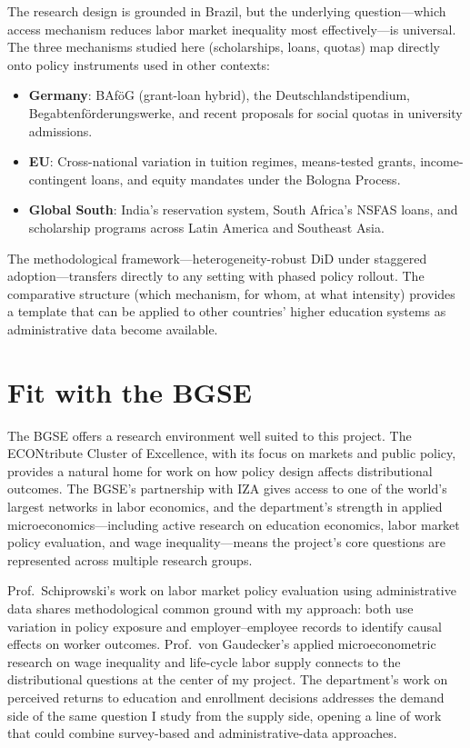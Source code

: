 \documentclass[a4paper,11pt]{article}
\begin{document}
The research design is grounded in Brazil, but the underlying question---which access mechanism reduces labor market inequality most effectively---is universal. The three mechanisms studied here (scholarships, loans, quotas) map directly onto policy instruments used in other contexts:

\begin{itemize}[nosep]
    \item \textbf{Germany}: BAf\"oG (grant-loan hybrid), the Deutschlandstipendium, Begabtenf\"orderungswerke, and recent proposals for social quotas in university admissions.
    \item \textbf{EU}: Cross-national variation in tuition regimes, means-tested grants, income-contingent loans, and equity mandates under the Bologna Process.
    \item \textbf{Global South}: India's reservation system, South Africa's NSFAS loans, and scholarship programs across Latin America and Southeast Asia.
\end{itemize}

The methodological framework---heterogeneity-robust DiD under staggered adoption---transfers directly to any setting with phased policy rollout. The comparative structure (which mechanism, for whom, at what intensity) provides a template that can be applied to other countries' higher education systems as administrative data become available.

\section{Fit with the BGSE}

The BGSE offers a research environment well suited to this project. The ECONtribute Cluster of Excellence, with its focus on markets and public policy, provides a natural home for work on how policy design affects distributional outcomes. The BGSE's partnership with IZA gives access to one of the world's largest networks in labor economics, and the department's strength in applied microeconomics---including active research on education economics, labor market policy evaluation, and wage inequality---means the project's core questions are represented across multiple research groups.

Prof.\ Schiprowski's work on labor market policy evaluation using administrative data shares methodological common ground with my approach: both use variation in policy exposure and employer--employee records to identify causal effects on worker outcomes. Prof.\ von Gaudecker's applied microeconometric research on wage inequality and life-cycle labor supply connects to the distributional questions at the center of my project. The department's work on perceived returns to education and enrollment decisions addresses the demand side of the same question I study from the supply side, opening a line of work that could combine survey-based and administrative-data approaches.
\end{document}
